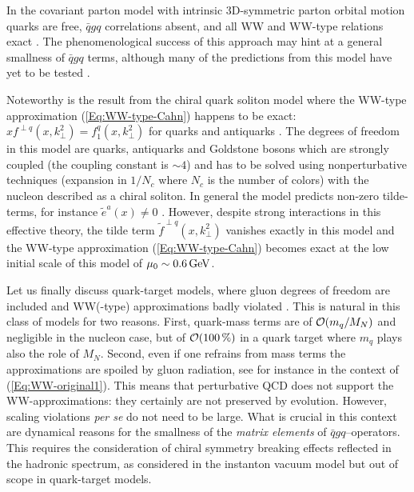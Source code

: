 \documentclass[a4paper,11pt]{article}
\def\kperp{k_\perp}
\begin{document}
In the covariant parton model with intrinsic 3D-symmetric parton 
orbital motion \cite{Zavada:1996kp}  quarks are free, $\bar{q}gq$ 
correlations absent, and all WW and WW-type relations exact
\cite{Efremov:2010mt,Efremov:2009ze}.
The phenomenological success of this approach \cite{Zavada:1996kp} may 
hint at a general smallness of $\bar{q}gq$ terms, although many of the 
predictions from this model have yet to be tested \cite{Efremov:2010mt}.

Noteworthy is the result from the chiral quark soliton
model where the WW-type approximation (\ref{Eq:WW-type-Cahn})
happens to be exact: $xf^{\perp q}(x,\kperp^2)=f_{1}^q(x,\kperp^2)$
for quarks and antiquarks \cite{Lorce:2014hxa}. The degrees of freedom
in this model are quarks, antiquarks and Goldstone bosons which are 
strongly coupled (the coupling constant is $\sim 4$) and has to be
solved using nonperturbative techniques (expansion in $1/N_c$ where
$N_c$ is the number of colors) with the nucleon described as a 
chiral soliton. In general the model predicts non-zero tilde-terms, for 
instance $\tilde{e}^a(x)\neq 0$ 
\cite{Schweitzer:2003uy,Ohnishi:2003mf,Cebulla:2007ej}.
However, despite strong interactions in this effective theory, the tilde 
term $\tilde{f}^{\perp q}(x,\kperp^2)$ vanishes exactly in this model 
\cite{Lorce:2014hxa} and the WW-type approximation (\ref{Eq:WW-type-Cahn})
becomes exact at the low initial scale of this model of 
$\mu_0\sim 0.6\,{\rm GeV}$.

Let us finally discuss quark-target models, 
where gluon degrees of freedom are included and WW(-type)
approximations badly violated
\cite{Kundu:2001pk,Schlegel:2004rg,Meissner:2007rx,Mukherjee:2009uy}.
This is natural in this class of models for two
reasons. First, quark-mass terms are of ${\cal O}(m_q/M_N)$ 
and negligible in the nucleon case, but of ${\cal O}(100\,\%)$
in a quark target where $m_q$ plays also the role of $M_N$. 
Second, even if one refrains from mass terms the approximations are 
spoiled by gluon radiation, see for instance \cite{Harindranath:1997qn} 
in the context of (\ref{Eq:WW-original1}).
This means that perturbative QCD does not support the WW-approximations:
they certainly are not preserved by evolution. However, scaling violations
{\it per se} do not need to be large. What is crucial in this context are 
dynamical reasons for the smallness of the {\sl matrix elements} of
$\bar{q}gq$--operators. This requires the consideration of chiral symmetry 
breaking effects reflected in the hadronic spectrum, as considered in the
instanton vacuum model \cite{Balla:1997hf,Dressler:1999hc} but 
out of scope in quark-target models.
\end{document}
